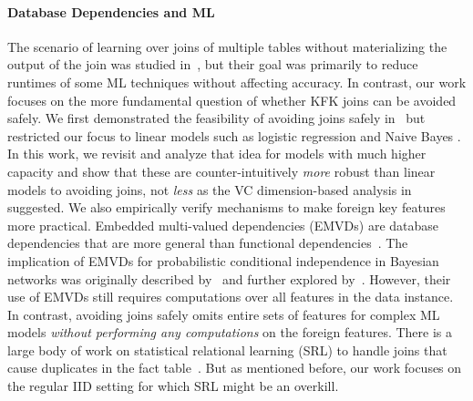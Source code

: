 \documentclass{vldb}
\begin{document}
\paragraph*{Database Dependencies and ML}
The scenario of learning over joins of multiple tables without materializing the output of the join was studied in~\cite{orion,olteanuf,rendle,santoku},
but their goal was primarily to reduce runtimes of some ML techniques without affecting accuracy. In contrast, our work focuses on the more 
fundamental question of whether KFK joins can be avoided safely. We first demonstrated the feasibility of avoiding joins safely in~\cite{hamlet} 
but restricted our focus to linear models such as logistic regression and Naive Bayes .
In this work, we revisit and analyze that idea for models with much higher capacity and show that these are counter-intuitively \textit{more} 
robust than linear models to avoiding joins, not \textit{less} as the VC dimension-based analysis in~\cite{hamlet} suggested. We also empirically
verify mechanisms to make foreign key features more practical.
Embedded multi-valued dependencies (EMVDs) are database dependencies that are more general than functional dependencies~\cite{dbtheorybook}. 
The implication of EMVDs for probabilistic conditional independence in Bayesian networks was originally described by~\cite{pearl} and further explored by~\cite{wong}.
However, their use of EMVDs still requires computations over all features in the data instance. In contrast, avoiding joins safely omits entire sets 
of features for complex ML models \textit{without performing any computations} on the foreign features.
There is a large body of work on statistical relational learning (SRL) to handle joins that cause duplicates in the fact table~\cite{srlbook}. But as mentioned before, 
our work focuses on the regular IID setting for which SRL might be an overkill.
\end{document}
